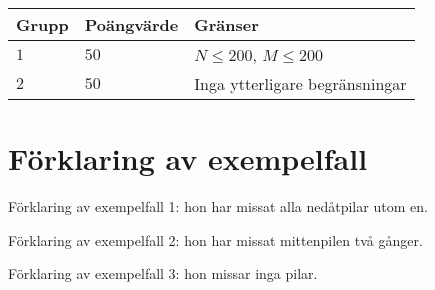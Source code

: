 \noindent
\begin{tabular}{| l | l | l |}
  \hline
  Grupp & Poängvärde & Gränser \\ \hline
  $1$   & $50$       & $N \leq 200$, $M \leq 200$ \\ \hline
  $2$   & $50$       & Inga ytterligare begränsningar \\ \hline
\end{tabular}

\section*{Förklaring av exempelfall}
Förklaring av exempelfall 1: hon har missat alla nedåtpilar utom en.

Förklaring av exempelfall 2: hon har missat mittenpilen två gånger.

Förklaring av exempelfall 3: hon missar inga pilar.